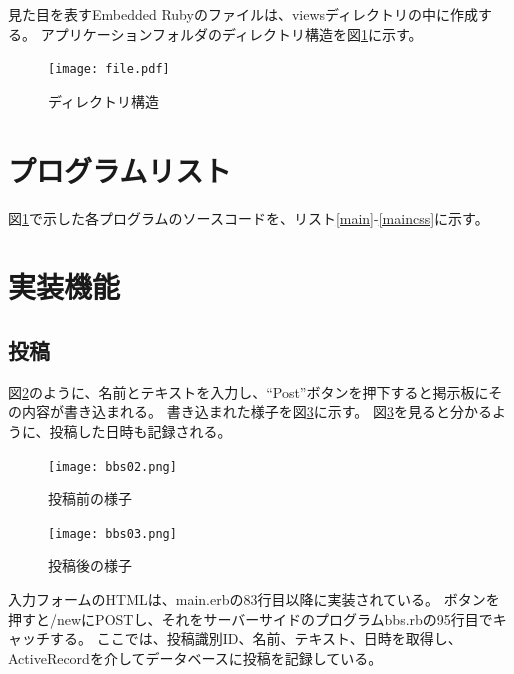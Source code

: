 \documentclass[a4j,titlepage]{jsarticle}
\begin{document}
見た目を表すEmbedded Rubyのファイルは、viewsディレクトリの中に作成する。
アプリケーションフォルダのディレクトリ構造を図\ref{dir}に示す。

\begin{figure}[H]
\centering
\texttt{[image: file.pdf]}
\caption{ディレクトリ構造}
\label{dir}
\end{figure}


\section{プログラムリスト}
図\ref{dir}で示した各プログラムのソースコードを、リスト\ref{main}-\ref{maincss}に示す。












\section{実装機能}
\subsection{投稿}
図\ref{f1}のように、名前とテキストを入力し、``Post''ボタンを押下すると掲示板にその内容が書き込まれる。
書き込まれた様子を図\ref{f2}に示す。
図\ref{f2}を見ると分かるように、投稿した日時も記録される。

\begin{figure}[H]
  \centering
  \texttt{[image: bbs02.png]}
  \caption{投稿前の様子}
  \label{f1}
\end{figure}

\begin{figure}[H]
  \centering
  \texttt{[image: bbs03.png]}
  \caption{投稿後の様子}
  \label{f2}
\end{figure}

入力フォームのHTMLは、main.erbの83行目以降に実装されている。
ボタンを押すと/newにPOSTし、それをサーバーサイドのプログラムbbs.rbの95行目でキャッチする。
ここでは、投稿識別ID、名前、テキスト、日時を取得し、ActiveRecordを介してデータベースに投稿を記録している。
\end{document}
